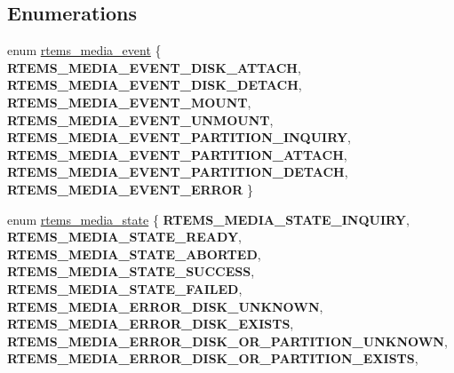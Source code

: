 \subsection*{Enumerations}
\begin{DoxyCompactItemize}
\item 
enum \mbox{\hyperlink{group__RTEMSIOMedia_gadd58c5799ee997413d4d6be2ac05197b}{rtems\+\_\+media\+\_\+event}} \{ \newline
{\bfseries R\+T\+E\+M\+S\+\_\+\+M\+E\+D\+I\+A\+\_\+\+E\+V\+E\+N\+T\+\_\+\+D\+I\+S\+K\+\_\+\+A\+T\+T\+A\+CH}, 
{\bfseries R\+T\+E\+M\+S\+\_\+\+M\+E\+D\+I\+A\+\_\+\+E\+V\+E\+N\+T\+\_\+\+D\+I\+S\+K\+\_\+\+D\+E\+T\+A\+CH}, 
{\bfseries R\+T\+E\+M\+S\+\_\+\+M\+E\+D\+I\+A\+\_\+\+E\+V\+E\+N\+T\+\_\+\+M\+O\+U\+NT}, 
{\bfseries R\+T\+E\+M\+S\+\_\+\+M\+E\+D\+I\+A\+\_\+\+E\+V\+E\+N\+T\+\_\+\+U\+N\+M\+O\+U\+NT}, 
\newline
{\bfseries R\+T\+E\+M\+S\+\_\+\+M\+E\+D\+I\+A\+\_\+\+E\+V\+E\+N\+T\+\_\+\+P\+A\+R\+T\+I\+T\+I\+O\+N\+\_\+\+I\+N\+Q\+U\+I\+RY}, 
{\bfseries R\+T\+E\+M\+S\+\_\+\+M\+E\+D\+I\+A\+\_\+\+E\+V\+E\+N\+T\+\_\+\+P\+A\+R\+T\+I\+T\+I\+O\+N\+\_\+\+A\+T\+T\+A\+CH}, 
{\bfseries R\+T\+E\+M\+S\+\_\+\+M\+E\+D\+I\+A\+\_\+\+E\+V\+E\+N\+T\+\_\+\+P\+A\+R\+T\+I\+T\+I\+O\+N\+\_\+\+D\+E\+T\+A\+CH}, 
{\bfseries R\+T\+E\+M\+S\+\_\+\+M\+E\+D\+I\+A\+\_\+\+E\+V\+E\+N\+T\+\_\+\+E\+R\+R\+OR}
 \}
\item 
enum \mbox{\hyperlink{group__RTEMSIOMedia_gaaec542a8c74e36e4edf774f2313fcd7c}{rtems\+\_\+media\+\_\+state}} \{ \newline
{\bfseries R\+T\+E\+M\+S\+\_\+\+M\+E\+D\+I\+A\+\_\+\+S\+T\+A\+T\+E\+\_\+\+I\+N\+Q\+U\+I\+RY}, 
{\bfseries R\+T\+E\+M\+S\+\_\+\+M\+E\+D\+I\+A\+\_\+\+S\+T\+A\+T\+E\+\_\+\+R\+E\+A\+DY}, 
{\bfseries R\+T\+E\+M\+S\+\_\+\+M\+E\+D\+I\+A\+\_\+\+S\+T\+A\+T\+E\+\_\+\+A\+B\+O\+R\+T\+ED}, 
{\bfseries R\+T\+E\+M\+S\+\_\+\+M\+E\+D\+I\+A\+\_\+\+S\+T\+A\+T\+E\+\_\+\+S\+U\+C\+C\+E\+SS}, 
\newline
{\bfseries R\+T\+E\+M\+S\+\_\+\+M\+E\+D\+I\+A\+\_\+\+S\+T\+A\+T\+E\+\_\+\+F\+A\+I\+L\+ED}, 
{\bfseries R\+T\+E\+M\+S\+\_\+\+M\+E\+D\+I\+A\+\_\+\+E\+R\+R\+O\+R\+\_\+\+D\+I\+S\+K\+\_\+\+U\+N\+K\+N\+O\+WN}, 
{\bfseries R\+T\+E\+M\+S\+\_\+\+M\+E\+D\+I\+A\+\_\+\+E\+R\+R\+O\+R\+\_\+\+D\+I\+S\+K\+\_\+\+E\+X\+I\+S\+TS}, 
{\bfseries R\+T\+E\+M\+S\+\_\+\+M\+E\+D\+I\+A\+\_\+\+E\+R\+R\+O\+R\+\_\+\+D\+I\+S\+K\+\_\+\+O\+R\+\_\+\+P\+A\+R\+T\+I\+T\+I\+O\+N\+\_\+\+U\+N\+K\+N\+O\+WN}, 
\newline
{\bfseries R\+T\+E\+M\+S\+\_\+\+M\+E\+D\+I\+A\+\_\+\+E\+R\+R\+O\+R\+\_\+\+D\+I\+S\+K\+\_\+\+O\+R\+\_\+\+P\+A\+R\+T\+I\+T\+I\+O\+N\+\_\+\+E\+X\+I\+S\+TS}, 

\end{DoxyCompactItemize}
